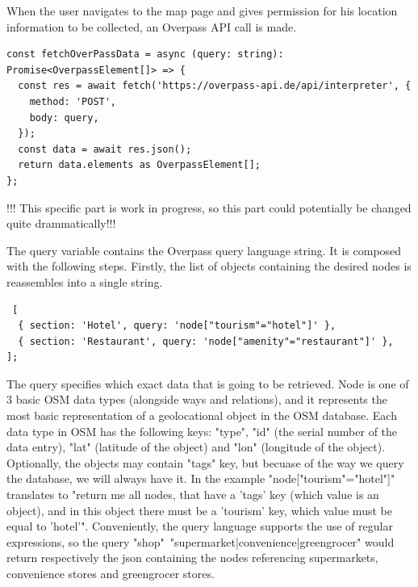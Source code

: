 When the user navigates to the map page and gives permission for his location information to be collected, an Overpass API call is made.
\begin{verbatim} 
const fetchOverPassData = async (query: string): Promise<OverpassElement[]> => {
  const res = await fetch('https://overpass-api.de/api/interpreter', {
    method: 'POST',
    body: query,
  });
  const data = await res.json();
  return data.elements as OverpassElement[];
};
\end{verbatim}
!!! This specific part is work in progress, so this part could potentially be changed quite drammatically!!!

The query variable contains the Overpass query language string. It is composed with the following steps. Firstly, the list of objects containing the desired nodes is reassembles into a single string. 
\begin{verbatim} 
 [
  { section: 'Hotel', query: 'node["tourism"="hotel"]' },
  { section: 'Restaurant', query: 'node["amenity"="restaurant"]' },
];
\end{verbatim}
The query specifies which exact data that is going to be retrieved. Node is one of 3 basic OSM data types (alongside ways and relations), and it represents the most basic representation of a geolocational object in the OSM database. Each data type in OSM has the following keys: "type", "id" (the serial number of the data entry), "lat" (latitude of the object) and "lon" (longitude of the object). Optionally, the objects may contain "tags" key, but becuase of the way we query the database, we will always have it. In the example "node["tourism"="hotel"]" translates to "return me all nodes, that have a 'tags' key (which value is an object), and in this object there must be a 'tourism' key, which value must be equal to 'hotel'". Conveniently, the query language supports the use of regular expressions, so the query "shop"~"supermarket|convenience|greengrocer" would return respectively the json containing the nodes referencing supermarkets, convenience stores and greengrocer stores.

